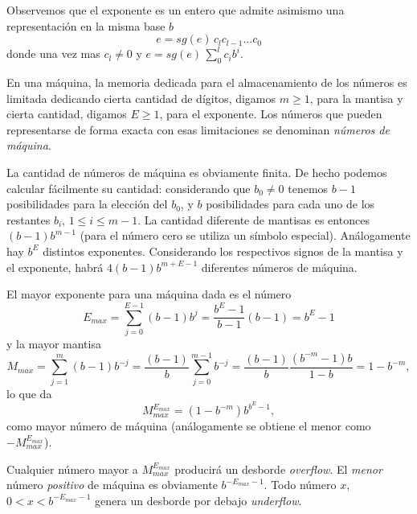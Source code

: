 Observemos que el exponente es un entero que admite asimismo una representación en la misma base $b$
$$e=sg(e)\, c_lc_{l-1}...c_{0}$$
donde una vez mas $c_l\neq 0$ y
$e=sg(e)\, \sum_0^{l}c_ib^i$.

En una máquina, la memoria dedicada para el almacenamiento de los números es limitada dedicando cierta cantidad de dígitos, digamos $m\ge 1$, para la mantisa y cierta cantidad, digamos $E\ge 1$, para el exponente. Los números que pueden representarse de forma exacta con esas limitaciones se denominan \emph{números de máquina}.

La cantidad de números de máquina es obviamente finita.  De hecho podemos calcular fácilmente su cantidad: considerando que $b_0\neq 0$ tenemos $b-1$ posibilidades para la elección del $b_0$, y $b$ posibilidades para cada uno de los restantes $b_i$, $1\le i\le m-1$. La cantidad diferente de mantisas es entonces $(b-1)b^{m-1}$ (para el número cero se utiliza un símbolo especial). Análogamente hay $b^{E}$ distintos exponentes. Considerando los respectivos signos de la mantisa y el exponente, habrá
$4(b-1)b^{m+E-1}$ diferentes números de máquina.

El mayor exponente para una máquina dada es el número
$$E_{max}=\sum_{j=0}^{E-1}(b-1)b^j=\frac{b^E-1}{b-1}(b-1)=b^E-1$$ y la mayor mantisa $$M_{max}=\sum_{j=1}^{m}(b-1)b^{-j}=\frac{(b-1)}{b}\sum_{j=0}^{m-1}b^{-j}=\frac{(b-1)}{b}\frac{(b^{-m}-1)b}{1-b}=1-b^{-m},$$ lo que da
$$
M_{max}^{E_{max}}=\left(1-b^{-m}\right)b^{b^E-1},
$$
como mayor número de máquina (análogamente se obtiene el menor como $-M_{max}^{E_{max}}$).

Cualquier número mayor a $M_{max}^{E_{max}}$ producirá  un desborde \emph{overflow}. El \emph{menor} número \emph{positivo} de máquina es obviamente $b^{-E_{max}-1}$. Todo número $x$, $0<x<b^{-E_{max}-1}$ genera un desborde por debajo \emph{underflow}.

